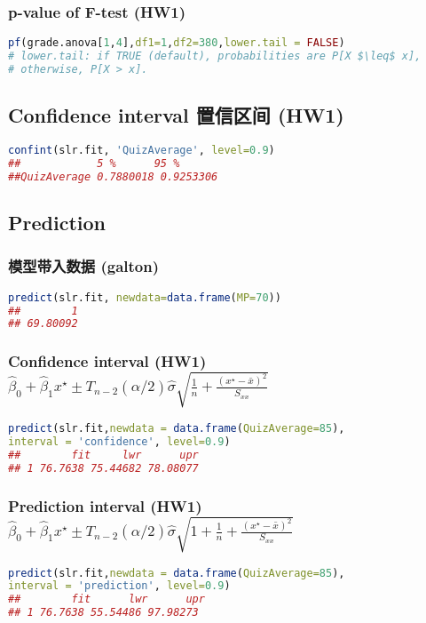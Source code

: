 \documentclass[11pt,a4paper]{article}
\begin{document}
\subsubsection{p-value of F-test (HW1)}
\begin{lstlisting}[language=R]
pf(grade.anova[1,4],df1=1,df2=380,lower.tail = FALSE)
# lower.tail: if TRUE (default), probabilities are P[X $\leq$ x],
# otherwise, P[X > x].
\end{lstlisting}


\subsection{Confidence interval 置信区间 (HW1)}
\begin{lstlisting}[language=R]
confint(slr.fit, 'QuizAverage', level=0.9)
##            5 %      95 %
##QuizAverage 0.7880018 0.9253306
\end{lstlisting}







\subsection{Prediction}
\subsubsection{模型带入数据 (galton)}
\begin{lstlisting}[language=R]
predict(slr.fit, newdata=data.frame(MP=70))
##        1 
## 69.80092
\end{lstlisting}
\subsubsection{Confidence interval (HW1) $
\hat{\beta}_{0}+\hat{\beta}_{1} x^{\star} \pm T_{n-2}(\alpha / 2) \hat{\sigma} \sqrt{\frac{1}{n}+\frac{\left(x^{\star}-\bar{x}\right)^{2}}{S_{x x}}}
$}
\begin{lstlisting}[language=R]
predict(slr.fit,newdata = data.frame(QuizAverage=85),
interval = 'confidence', level=0.9)
##        fit     lwr      upr
## 1 76.7638 75.44682 78.08077
\end{lstlisting}
\subsubsection{Prediction interval (HW1) $
\hat{\beta}_{0}+\hat{\beta}_{1} x^{\star} \pm T_{n-2}(\alpha / 2) \hat{\sigma} \sqrt{1+\frac{1}{n}+\frac{\left(x^{\star}-\bar{x}\right)^{2}}{S_{x x}}}
$}
\begin{lstlisting}[language=R]
predict(slr.fit,newdata = data.frame(QuizAverage=85),
interval = 'prediction', level=0.9)
##        fit      lwr      upr
## 1 76.7638 55.54486 97.98273
\end{lstlisting}
\end{document}
